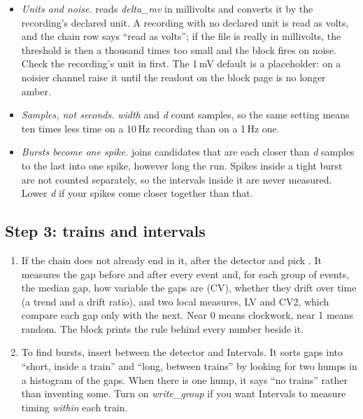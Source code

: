 \begin{watchout}
\begin{itemize}
\item \emph{Units and noise.}  reads \emph{delta\_mv} in
  millivolts and converts it by the recording's declared unit. A recording with no declared
  unit is read as volts, and the chain row says ``read as volts''; if the file is really in
  millivolts, the threshold is then a thousand times too small and the block fires on
  noise. Check the recording's unit in  first. The 1\,mV default
  is a placeholder: on a noisier channel raise it until the readout on the block page is no
  longer amber.
\item \emph{Samples, not seconds.} \emph{width} and \emph{d} count samples, so the same
  setting means ten times less time on a 10\,Hz recording than on a 1\,Hz one.
\item \emph{Bursts become one spike.}  joins candidates that
  are each closer than \emph{d} samples to the last into one spike, however long the run.
  Spikes inside a tight burst are not counted separately, so the intervals inside it are
  never measured. Lower \emph{d} if your spikes come closer together than that.
\end{itemize}
\end{watchout}

\subsection*{Step 3: trains and intervals}
\begin{enumerate}
\item If the chain does not already end in it,  after the detector and pick
  . It measures the gap before and after every event and,
  for each group of events, the median gap, how variable the gaps are (CV), whether they drift
  over time (a trend and a drift ratio), and two local measures, LV and CV2, which compare each
  gap only with the next. Near 0 means clockwork, near 1 means random. The block prints the
  rule behind every number beside it.
\item To find bursts, insert  between the detector and
  Intervals. It sorts gaps into ``short, inside a train'' and ``long, between trains'' by
  looking for two humps in a histogram of the gaps. When there is one hump, it says ``no
  trains'' rather than inventing some. Turn on \emph{write\_group} if you want Intervals
  to measure timing \emph{within} each train.
\end{enumerate}

